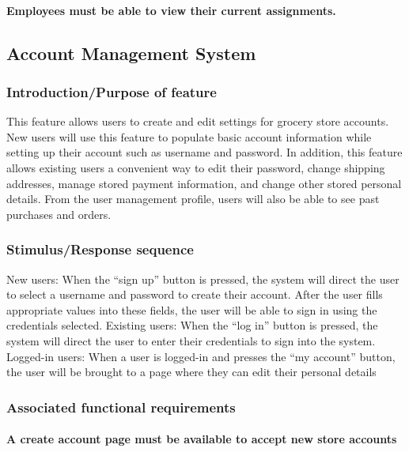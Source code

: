 \documentclass{scrreprt}
\begin{document}
\paragraph[]{\normalfont Employees must be able to view their current assignments.}

\subsection{Account Management System}
\subsubsection{Introduction/Purpose of feature}
This feature allows users to create and edit settings for grocery store accounts.  New users will use this feature to populate basic account information while setting up their account such as username and password.  In addition, this feature allows existing users a convenient way to edit their password, change shipping addresses, manage stored payment information, and change other stored personal details.  From the user management profile, users will also be able to see past purchases and orders.

\subsubsection{Stimulus/Response sequence}
\indent New users: When the “sign up” button is pressed, the system will direct the user to select a username and password to create their account.  After the user fills appropriate values into these fields, the user will be able to sign in using the credentials selected.
Existing users: When the “log in” button is pressed, the system will direct the user to enter their credentials to sign into the system.  
Logged-in users: When a user is logged-in and presses the “my account” button, the user will be brought to a page where they can edit their personal details

\subsubsection{Associated functional requirements}
\paragraph[]{\normalfont A create account page must be available to accept new store accounts}
\end{document}
